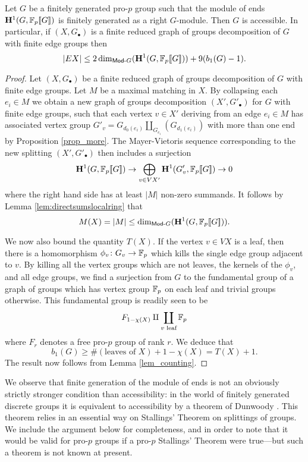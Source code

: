 \documentclass[draft, a4paper]{article}
\begin{document}
\begin{theorem}\label{thm:main}
Let $G$ be a finitely generated pro-$p$ group such that the module of ends ${\bf H}^1(G,{\mathbb{F}_p[\![G]\!]})$ is finitely generated as a right $G$-module. Then $G$ is accessible. In particular, if $(X,G_\bullet)$ is a finite reduced graph of groups decomposition of $G$ with finite edge groups then
\[|EX|\leq 2\dim_{{\sf Mod}\text{-}G}({\bf H}^1(G,{\mathbb{F}_p[\![G]\!]})) + 9(b_1(G)-1).\]
\end{theorem}
\begin{proof}
Let $(X,G_\bullet)$ be a finite reduced graph of groups decomposition of $G$ with finite edge groups. Let $M$ be a maximal matching in $X$. By collapsing each $e_i\in M$ we obtain \cite[Proposition 2.8]{Wilkes19} a new graph of groups decomposition $(X',G'_\bullet)$ for $G$ with finite edge groups, such that each vertex $v\in X'$ deriving from an edge $e_i\in M$ has associated vertex group $G'_v = G_{d_0(e_i)} \amalg_{G_{e_i}} (G_{d_1(e_i)})$ with more than one end by Proposition \ref{prop_more}. The Mayer-Vietoris sequence corresponding to the new splitting $(X',G'_\bullet)$ then includes a surjection
\[{\bf H}^1(G,{\mathbb{F}_p[\![G]\!]}) \to \bigoplus_{v\in VX'}{\bf H}^1(G'_v,{\mathbb{F}_p[\![G]\!]})\to 0\]
where the right hand side has at least $|M|$ non-zero summands. It follows by Lemma \ref{lem:directsumslocalring} that 
\[M(X)=|M|\leq \dim_{{\sf Mod}\text{-}G}({\bf H}^1(G,{\mathbb{F}_p[\![G]\!]})).\]

We now also bound the quantity $T(X)$. If the vertex $v\in VX$ is a leaf, then there is a homomorphism $\phi_v\colon G_v\to \mathbb{F}_p$ which kills the single edge group adjacent to $v$. By killing all the vertex groups which are not leaves, the kernels of the $\phi_v$, and all edge groups, we find a surjection from $G$ to the fundamental group of a graph of groups which has vertex group $\mathbb{F}_p$ on each leaf and trivial groups otherwise. This fundamental group is readily seen to be
\[F_{1-\chi(X)} \amalg \coprod_{v \text{ leaf}} \mathbb{F}_p\]
where $F_r$ denotes a free pro-$p$ group of rank $r$. We deduce that
\[b_1(G) \geq \#(\text{leaves of }X) + 1-\chi(X) = T(X)+1.\]
The result now follows from Lemma \ref{lem_counting}.
\end{proof}

We observe that finite generation of the module of ends is not an obviously strictly stronger condition than accessibility: in the world of finitely generated discrete groups it is equivalent to accessibility by a theorem of Dunwoody \cite[Theorem 5.5]{Dunwoody79}. This theorem relies in an essential way on Stallings' Theorem on splittings of groups. We include the argument below for completeness, and in order to note that it would be valid for pro-$p$ groups if a pro-$p$ Stallings' Theorem were true---but such a theorem is not known at present.
\end{document}
